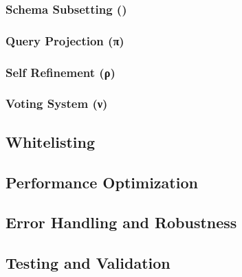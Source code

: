 \subsubsection{Schema Subsetting ($$)}

\subsubsection{Query Projection (π)}

\subsubsection{Self Refinement (ρ)}

\subsubsection{Voting System (ν)}

\subsection{Whitelisting}\label{implementation:whitelisting}

\subsection{Performance Optimization}

\subsection{Error Handling and Robustness}

\subsection{Testing and Validation}

\newpage
